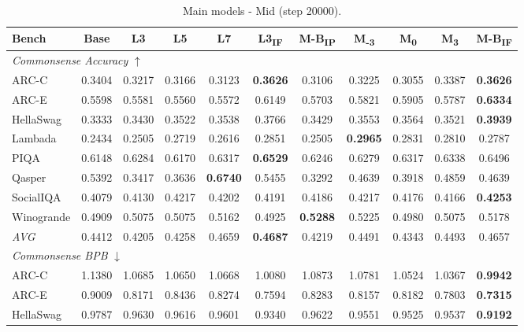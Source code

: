 \begin{table}[htbp]
\centering
\setlength{\tabcolsep}{2.5pt}
\caption{Main models - Mid (step 20000).}
\label{tab:main_mid}
\begin{tabular}{lcccccccccc}
\toprule
Bench & Base & L3 & L5 & L7 & L3\textsubscript{IF} & M-B\textsubscript{IP} & M\textsubscript{-3} & M\textsubscript{0} & M\textsubscript{3} & M-B\textsubscript{IF} \\
\midrule
\multicolumn{11}{l}{\textit{Commonsense Accuracy} $\uparrow$} \\
ARC-C & 0.3404 & 0.3217 & 0.3166 & 0.3123 & \textbf{0.3626} & 0.3106 & 0.3225 & 0.3055 & 0.3387 & \textbf{0.3626} \\
ARC-E & 0.5598 & 0.5581 & 0.5560 & 0.5572 & 0.6149 & 0.5703 & 0.5821 & 0.5905 & 0.5787 & \textbf{0.6334} \\
HellaSwag & 0.3333 & 0.3430 & 0.3522 & 0.3538 & 0.3766 & 0.3429 & 0.3553 & 0.3564 & 0.3521 & \textbf{0.3939} \\
Lambada & 0.2434 & 0.2505 & 0.2719 & 0.2616 & 0.2851 & 0.2505 & \textbf{0.2965} & 0.2831 & 0.2810 & 0.2787 \\
PIQA & 0.6148 & 0.6284 & 0.6170 & 0.6317 & \textbf{0.6529} & 0.6246 & 0.6279 & 0.6317 & 0.6338 & 0.6496 \\
Qasper & 0.5392 & 0.3417 & 0.3636 & \textbf{0.6740} & 0.5455 & 0.3292 & 0.4639 & 0.3918 & 0.4859 & 0.4639 \\
SocialIQA & 0.4079 & 0.4130 & 0.4217 & 0.4202 & 0.4191 & 0.4186 & 0.4217 & 0.4176 & 0.4166 & \textbf{0.4253} \\
Winogrande & 0.4909 & 0.5075 & 0.5075 & 0.5162 & 0.4925 & \textbf{0.5288} & 0.5225 & 0.4980 & 0.5075 & 0.5178 \\
\textit{AVG} & 0.4412 & 0.4205 & 0.4258 & 0.4659 & \textbf{0.4687} & 0.4219 & 0.4491 & 0.4343 & 0.4493 & 0.4657 \\
\midrule
\multicolumn{11}{l}{\textit{Commonsense BPB} $\downarrow$} \\
ARC-C & 1.1380 & 1.0685 & 1.0650 & 1.0668 & 1.0080 & 1.0873 & 1.0781 & 1.0524 & 1.0367 & \textbf{0.9942} \\
ARC-E & 0.9009 & 0.8171 & 0.8436 & 0.8274 & 0.7594 & 0.8283 & 0.8157 & 0.8182 & 0.7803 & \textbf{0.7315} \\
HellaSwag & 0.9787 & 0.9630 & 0.9616 & 0.9601 & 0.9340 & 0.9622 & 0.9551 & 0.9525 & 0.9537 & \textbf{0.9192} \\

\end{tabular}
\end{table}
